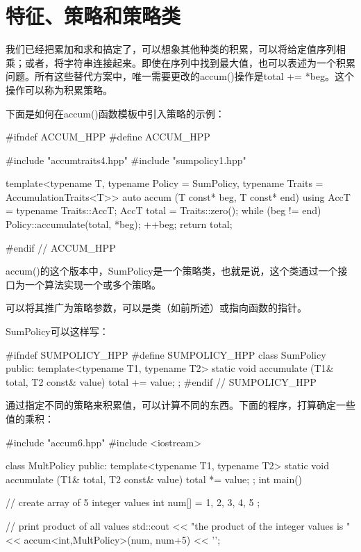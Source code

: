 \section{特征、策略和策略类}

我们已经把累加和求和搞定了，可以想象其他种类的积累，可以将给定值序列相乘；或者，将字符串连接起来。即使在序列中找到最大值，也可以表述为一个积累问题。所有这些替代方案中，唯一需要更改的accum()操作是total += *beg。这个操作可以称为积累策略。

下面是如何在accum()函数模板中引入策略的示例：

\begin{cpp}
#ifndef ACCUM_HPP
#define ACCUM_HPP

#include "accumtraits4.hpp"
#include "sumpolicy1.hpp"

template<typename T,
		typename Policy = SumPolicy,
		typename Traits = AccumulationTraits<T>>
auto accum (T const* beg, T const* end)
{
	using AccT = typename Traits::AccT;
	AccT total = Traits::zero();
	while (beg != end) {
		Policy::accumulate(total, *beg);
		++beg;
	}
	return total;
}

#endif // ACCUM_HPP
\end{cpp}

accum()的这个版本中，SumPolicy是一个策略类，也就是说，这个类通过一个接口为一个算法实现一个或多个策略。

\begin{notice}
可以将其推广为策略参数，可以是类（如前所述）或指向函数的指针。
\end{notice}

SumPolicy可以这样写：

\begin{cpp}
#ifndef SUMPOLICY_HPP
#define SUMPOLICY_HPP
class SumPolicy {
	public:
	template<typename T1, typename T2>
	static void accumulate (T1& total, T2 const& value) {
		total += value;
	}
};
#endif // SUMPOLICY_HPP
\end{cpp}

通过指定不同的策略来积累值，可以计算不同的东西。下面的程序，打算确定一些值的乘积：

\begin{cpp}
#include "accum6.hpp"
#include <iostream>

class MultPolicy {
	public:
	template<typename T1, typename T2>
	static void accumulate (T1& total, T2 const& value) {
		total *= value;
	}
};
int main()
{
	// create array of 5 integer values
	int num[] = { 1, 2, 3, 4, 5 };
	
	// print product of all values
	std::cout << "the product of the integer values is "
			<< accum<int,MultPolicy>(num, num+5)
			<< '\n';
}
\end{cpp}

